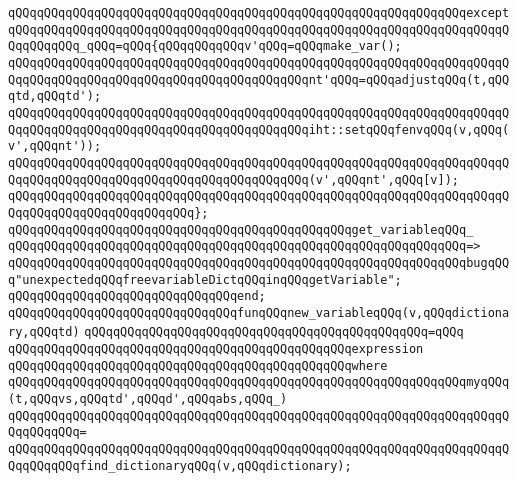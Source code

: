 \verb|qQQqqQQqqQQqqQQqqQQqqQQqqQQqqQQqqQQqqQQqqQQqqQQqqQQqqQQqqQQqqQQqexcept|\newline
\verb|qQQqqQQqqQQqqQQqqQQqqQQqqQQqqQQqqQQqqQQqqQQqqQQqqQQqqQQqqQQqqQQqqQQqqQQqqQQqqQQq_qQQq=qQQq{qQQqqQQqqQQqv'qQQq=qQQqmake_var();|\newline
\verb|qQQqqQQqqQQqqQQqqQQqqQQqqQQqqQQqqQQqqQQqqQQqqQQqqQQqqQQqqQQqqQQqqQQqqQQqqQQqqQQqqQQqqQQqqQQqqQQqqQQqqQQqqQQqqQQqnt'qQQq=qQQqadjustqQQq(t,qQQqtd,qQQqtd');|\newline
\verb|qQQqqQQqqQQqqQQqqQQqqQQqqQQqqQQqqQQqqQQqqQQqqQQqqQQqqQQqqQQqqQQqqQQqqQQqqQQqqQQqqQQqqQQqqQQqqQQqqQQqqQQqqQQqqQQqiht::setqQQqfenvqQQq(v,qQQq(v',qQQqnt'));|\newline
\newline
\verb|qQQqqQQqqQQqqQQqqQQqqQQqqQQqqQQqqQQqqQQqqQQqqQQqqQQqqQQqqQQqqQQqqQQqqQQqqQQqqQQqqQQqqQQqqQQqqQQqqQQqqQQqqQQqqQQq(v',qQQqnt',qQQq[v]);|\newline
\verb|qQQqqQQqqQQqqQQqqQQqqQQqqQQqqQQqqQQqqQQqqQQqqQQqqQQqqQQqqQQqqQQqqQQqqQQqqQQqqQQqqQQqqQQqqQQqqQQq};|\newline
\newline
\verb|qQQqqQQqqQQqqQQqqQQqqQQqqQQqqQQqqQQqqQQqqQQqqQQqget_variableqQQq_|\newline
\verb|qQQqqQQqqQQqqQQqqQQqqQQqqQQqqQQqqQQqqQQqqQQqqQQqqQQqqQQqqQQqqQQq=>|\newline
\verb|qQQqqQQqqQQqqQQqqQQqqQQqqQQqqQQqqQQqqQQqqQQqqQQqqQQqqQQqqQQqqQQqbugqQQq"unexpectedqQQqfreevariableDictqQQqinqQQqgetVariable";|\newline
\verb|qQQqqQQqqQQqqQQqqQQqqQQqqQQqqQQqend;|\newline
\newline
\verb|qQQqqQQqqQQqqQQqqQQqqQQqqQQqqQQqfunqQQqnew_variableqQQq(v,qQQqdictionary,qQQqtd)|\newline
\verb|qQQqqQQqqQQqqQQqqQQqqQQqqQQqqQQqqQQqqQQqqQQqqQQq=qQQq|\newline
\verb|qQQqqQQqqQQqqQQqqQQqqQQqqQQqqQQqqQQqqQQqqQQqqQQqexpression|\newline
\verb|qQQqqQQqqQQqqQQqqQQqqQQqqQQqqQQqqQQqqQQqqQQqqQQqwhere|\newline
\verb|qQQqqQQqqQQqqQQqqQQqqQQqqQQqqQQqqQQqqQQqqQQqqQQqqQQqqQQqqQQqqQQqmyqQQq(t,qQQqvs,qQQqtd',qQQqd',qQQqabs,qQQq_)|\newline
\verb|qQQqqQQqqQQqqQQqqQQqqQQqqQQqqQQqqQQqqQQqqQQqqQQqqQQqqQQqqQQqqQQqqQQqqQQqqQQqqQQq=|\newline
\verb|qQQqqQQqqQQqqQQqqQQqqQQqqQQqqQQqqQQqqQQqqQQqqQQqqQQqqQQqqQQqqQQqqQQqqQQqqQQqqQQqfind_dictionaryqQQq(v,qQQqdictionary);|\newline
